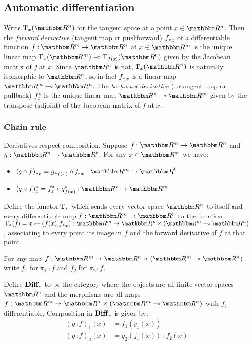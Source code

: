 \subsection{Automatic differentiation}

Write $\tangents_x(\RR^n)$ for the tangent space at a point $x \in \RR^n$. Then the \emph{forward derivative}
(tangent map or pushforward) ${f_{*}}_x$ of a differentiable function $f: \RR^m \to \RR^n$ at $x \in \RR^m$
is the unique linear map $\tangents_x(\RR^m) \linearto \tangents_{f(x)}(\RR^n)$ given by the Jacobean matrix
of $f$ at $x$. Since $\RR^n$ is flat, $\tangents_x(\RR^n)$ is naturally isomorphic to $\RR^n$, so in fact
${f_{*}}_x$ is a linear map $\RR^m \linearto \RR^n$. The \emph{backward derivative} (cotangent map or
pullback) $f^{*}_x$ is the unique linear map $\RR^n \linearto \RR^m$ given by the transpose (adjoint) of
the Jacobean matrix of $f$ at $x$.

\subsubsection{Chain rule}

Derivatives respect composition. Suppose $f: \RR^m \to \RR^n$ and $g: \RR^n \to \RR^k$. For any $x \in \RR^m$
we have:

\begin{itemize}
\item $\pushf{(g \comp f)}_x = \pushf{g}_{f(x)} \comp \pushf{f}_x: \RR^m \to \RR^k$
\item $\pullf{(g \comp f)}_x = \pullf{f}_{x} \comp \pullf{g}_{f(x)}: \RR^k \to \RR^m$
\end{itemize}

\begin{definition}
Define the functor $\mathrm{T}_*$ which sends every vector space $\RR^n$ to itself and every differentiable map
$f: \RR^m \to \RR^n$ to the function $\tangents_*(f) = x \mapsto (f(x), \pushf{f}_x): \RR^m \to \RR^n \times
(\RR^m \linearto \RR^n)$, associating to every point its image in $f$ and the forward derivative of $f$ at
that point.
\end{definition}

For any map $f: \RR^m \to \RR^n \times (\RR^m \linearto \RR^n)$ write $f_1$ for $\pi_1 \comp f$ and $f_2$ for
$\pi_2 \comp f$.

\begin{definition}[$\Diff$]
\label{def:auto-diff:Diff}
Define $\mathbf{Diff}_*$ to be the category where the objects are all finite vector spaces $\RR^n$ and the morphisms
are all maps $f: \RR^m \to \RR^n \times (\RR^m \linearto \RR^n)$ with $f_1$ differentiable. Composition in
$\mathbf{Diff}_*$ is given by:
\begin{align*}
(g \comp f)_1(x) &= f_1(g_1(x)) \\
(g \comp f)_2(x) &= g_2(f_1(x)) \comp f_2(x)
\end{align*}
\end{definition}

